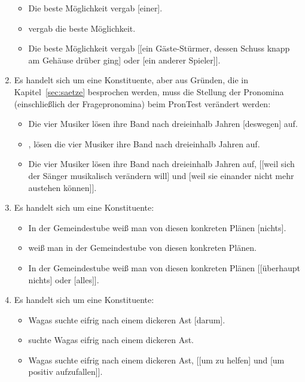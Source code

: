 \begin{enumerate}
\begin{itemize}
      \item \PronTest Die beste Möglichkeit vergab [einer].
      \item {} vergab die beste Möglichkeit.
      \item \KoorTest Die beste Möglichkeit vergab [[ein Gäste-Stürmer, dessen Schuss knapp am Gehäuse drüber ging] oder [ein anderer Spieler]].
    \end{itemize}
  \item Es handelt sich um eine Konstituente, aber aus Gründen, die in Kapitel~\ref{sec:saetze} besprochen werden, muss die Stellung der Pronomina (einschließlich der Fragepronomina) beim PronTest verändert werden:
    \begin{itemize}\Lf
      \item \PronTest Die vier Musiker lösen ihre Band nach dreieinhalb Jahren [deswegen] auf.
      \item {}, lösen die vier Musiker ihre Band nach dreieinhalb Jahren auf.
      \item \KoorTest Die vier Musiker lösen ihre Band nach dreieinhalb Jahren auf, [[weil sich der Sänger musikalisch verändern will] und [weil sie einander nicht mehr austehen können]].
    \end{itemize}
  \item Es handelt sich um eine Konstituente:
    \begin{itemize}\Lf
      \item \PronTest In der Gemeindestube weiß man von diesen konkreten Plänen [nichts].
      \item {} weiß man in der Gemeindestube von diesen konkreten Plänen.
      \item \KoorTest In der Gemeindestube weiß man von diesen konkreten Plänen [[überhaupt nichts] oder [alles]].
    \end{itemize}
  \item Es handelt sich um eine Konstituente:
    \begin{itemize}\Lf
      \item \PronTest \Ast Wagas suchte eifrig nach einem dickeren Ast [darum].
      \item \VfTest [Um zu helfen] suchte Wagas eifrig nach einem dickeren Ast.
      \item \KoorTest Wagas suchte eifrig nach einem dickeren Ast, [[um zu helfen] und [um positiv aufzufallen]].
    \end{itemize}

\end{enumerate}
